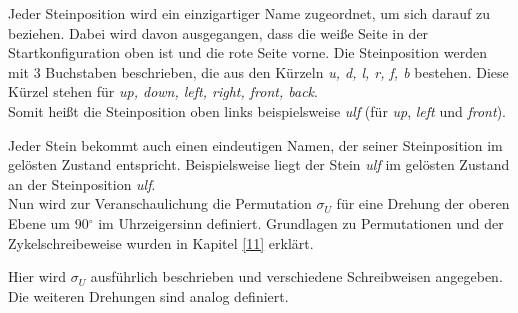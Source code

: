 \documentclass[12pt,a4paper, usenames, dvipsnames]{article}
\begin{document}
Jeder Steinposition wird ein einzigartiger Name zugeordnet, um sich darauf zu beziehen. Dabei wird davon ausgegangen, dass die weiße Seite in der Startkonfiguration oben ist und die rote Seite vorne. Die Steinposition werden mit 3 Buchstaben beschrieben, die aus den Kürzeln \textit{u, d, l, r, f, b} bestehen. Diese Kürzel stehen für \textit{up, down, left, right, front, back}. \\
Somit heißt die Steinposition oben links beispielsweise \textit{ulf} (für \textit{up}, \textit{left} und \textit{front}). 


Jeder Stein bekommt auch einen eindeutigen Namen, der seiner Steinposition im gelösten Zustand entspricht. Beispielsweise liegt der Stein \textit{ulf} im gelösten Zustand an der Steinposition \textit{ulf}.
\\
Nun wird zur Veranschaulichung die Permutation $\sigma_U$ für eine Drehung der oberen Ebene um 90$^\circ$ im Uhrzeigersinn definiert. Grundlagen zu Permutationen und der Zykelschreibeweise wurden in Kapitel \ref{11} erklärt.

Hier wird $\sigma_U$ ausführlich beschrieben und verschiedene Schreibweisen angegeben. Die weiteren Drehungen sind analog definiert. 
\end{document}
